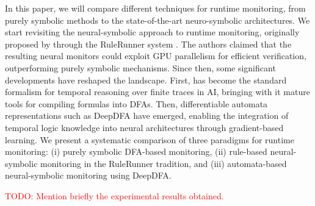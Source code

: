 In this paper, we will compare different techniques for runtime monitoring, from purely symbolic methods to the state-of-the-art neuro-symbolic architectures. We start revisiting the neural-symbolic approach to runtime monitoring, originally proposed by \cite{perotti2014neural,perotti2015neural} through the RuleRunner system \cite{perotti2015runtime}. The authors claimed that the resulting neural monitors could exploit GPU parallelism for efficient verification, outperforming purely symbolic mechanisms. Since then, some significant developments have reshaped the landscape. 
First, \ltlf \cite{LTLf} has become the standard formalism for temporal reasoning over finite traces in AI, bringing with it mature tools for compiling formulas into DFAs. Then, differentiable automata representations such as DeepDFA \cite{deepdfa_ecai2024} have emerged, enabling the integration of temporal logic knowledge into neural architectures through gradient-based learning.
We present a systematic comparison of three paradigms for \ltlf runtime monitoring: (i) purely symbolic DFA-based monitoring, (ii) rule-based neural-symbolic monitoring in the RuleRunner tradition, and (iii) automata-based neural-symbolic monitoring using DeepDFA. 

\noindent
\textcolor{red}{TODO: Mention briefly the experimental results obtained.}